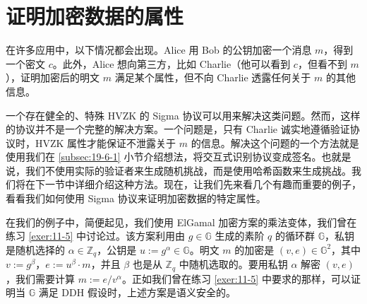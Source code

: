 \section{证明加密数据的属性}\label{sec:20-2}

在许多应用中，以下情况都会出现。Alice 用 Bob 的公钥加密一个消息 $m$，得到一个密文 $c$。此外，Alice 想向第三方，比如 Charlie（他可以看到 $c$，但看不到 $m$），证明加密后的明文 $m$ 满足某个属性，但不向 Charlie 透露任何关于 $m$ 的其他信息。

一个存在健全的、特殊 HVZK 的 Sigma 协议可以用来解决这类问题。然而，这样的协议并不是一个完整的解决方案。一个问题是，只有 Charlie 诚实地遵循验证协议时，HVZK 属性才能保证不泄露关于 $m$ 的信息。解决这个问题的一个方法就是使用我们在 \ref{subsec:19-6-1} 小节介绍想法，将交互式识别协议变成签名。也就是说，我们不使用实际的验证者来生成随机挑战，而是使用哈希函数来生成挑战。我们将在下一节中详细介绍这种方法。现在，让我们先来看几个有趣而重要的例子，看看我们如何使用 Sigma 协议来证明加密数据的特定属性。

在我们的例子中，简便起见，我们使用 ElGamal 加密方案的乘法变体，我们曾在练习 \ref{exer:11-5} 中讨论过。该方案利用由 $g\in\mathbb{G}$ 生成的素阶 $q$ 的循环群 $\mathbb{G}$，私钥是随机选择的 $\alpha\in\mathbb{Z}_q$，公钥是 $u:=g^\alpha\in\mathbb{G}$。明文 $m$ 的加密是 $(v,e)\in\mathbb{G}^2$，其中 $v:=g^\beta$，$e:=u^\beta\cdot m$，并且 $\beta$ 也是从 $\mathbb{Z}_q$ 中随机选取的。要用私钥 $\alpha$ 解密 $(v,e)$，我们需要计算 $m:={e}/{v^\alpha}$。正如我们曾在练习 \ref{exer:11-5} 中要求的那样，可以证明当 $\mathbb{G}$ 满足 DDH 假设时，上述方案是语义安全的。

